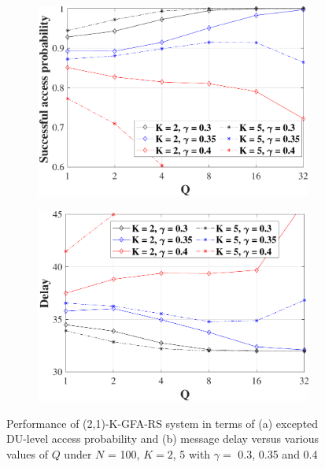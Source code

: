 \documentclass[a4paper]{IEEEtran}
\begin{document}
\begin{figure}[ht!]
    \centering
    \begin{subfigure}[b]{0.47\textwidth}
         \centering
         \includegraphics[width=\textwidth]{Figs/analy_sim_sap_vers_Q.pdf}
         \label{fig: sap}
         \caption{}
     \end{subfigure}
     \begin{subfigure}[b]{0.47\textwidth}
         \centering
         \includegraphics[width=\textwidth]{Figs/analy_sim_delay_vers_Q.pdf}
         \label{fig: delay}
         \caption{}
     \end{subfigure}
    \caption{Performance of (2,1)-K-GFA-RS system in terms of (a) excepted DU-level access probability and (b) message  delay versus various values of $Q$ under $N$ = 100, $K = 2$, 5 with $\gamma = $ 0.3, 0.35 and 0.4}
    \label{fig: result_2}
\end{figure}
\end{document}
